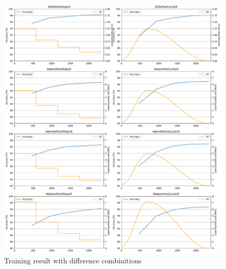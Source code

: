 \documentclass{article}
\begin{document}
\begin{figure}[ht!]
    \centering
    \includegraphics[width=\linewidth]{images/lr_range_eval.pdf}
    \caption{Training result with difference combinitions}\label{fig:lr_range_eval}
\end{figure}
\end{document}
